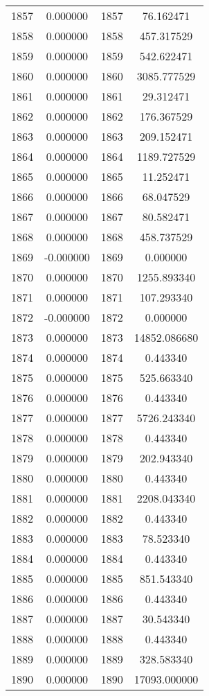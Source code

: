 \documentclass[12pt]{article}
\begin{document}
\begin{longtable}{@{}cccc@{}}
1857 & 0.000000 & 1857 & 76.162471 \\
1858 & 0.000000 & 1858 & 457.317529 \\
1859 & 0.000000 & 1859 & 542.622471 \\
1860 & 0.000000 & 1860 & 3085.777529 \\
1861 & 0.000000 & 1861 & 29.312471 \\
1862 & 0.000000 & 1862 & 176.367529 \\
1863 & 0.000000 & 1863 & 209.152471 \\
1864 & 0.000000 & 1864 & 1189.727529 \\
1865 & 0.000000 & 1865 & 11.252471 \\
1866 & 0.000000 & 1866 & 68.047529 \\
1867 & 0.000000 & 1867 & 80.582471 \\
1868 & 0.000000 & 1868 & 458.737529 \\
1869 & -0.000000 & 1869 & 0.000000 \\
1870 & 0.000000 & 1870 & 1255.893340 \\
1871 & 0.000000 & 1871 & 107.293340 \\
1872 & -0.000000 & 1872 & 0.000000 \\
1873 & 0.000000 & 1873 & 14852.086680 \\
1874 & 0.000000 & 1874 & 0.443340 \\
1875 & 0.000000 & 1875 & 525.663340 \\
1876 & 0.000000 & 1876 & 0.443340 \\
1877 & 0.000000 & 1877 & 5726.243340 \\
1878 & 0.000000 & 1878 & 0.443340 \\
1879 & 0.000000 & 1879 & 202.943340 \\
1880 & 0.000000 & 1880 & 0.443340 \\
1881 & 0.000000 & 1881 & 2208.043340 \\
1882 & 0.000000 & 1882 & 0.443340 \\
1883 & 0.000000 & 1883 & 78.523340 \\
1884 & 0.000000 & 1884 & 0.443340 \\
1885 & 0.000000 & 1885 & 851.543340 \\
1886 & 0.000000 & 1886 & 0.443340 \\
1887 & 0.000000 & 1887 & 30.543340 \\
1888 & 0.000000 & 1888 & 0.443340 \\
1889 & 0.000000 & 1889 & 328.583340 \\
1890 & 0.000000 & 1890 & 17093.000000 \\

\end{longtable}
\end{document}
